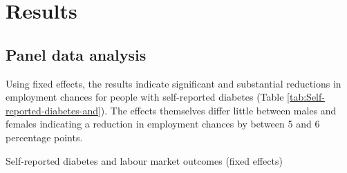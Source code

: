 \section{\label{sec:RESULTS} Results}


\subsection{Panel data analysis}

Using fixed effects, the results indicate significant and substantial
reductions in employment chances for people with self-reported diabetes
(Table \ref{tab:Self-reported-diabetes-and}). The effects themselves
differ little between males and females indicating a reduction in
employment chances by between 5 and 6 percentage points. 
\begin{table}[ph]
\caption{\label{tab:Self-reported-diabetes-and}Self-reported diabetes and
labour market outcomes (fixed effects)}


\end{table}
